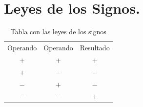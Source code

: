 \documentclass[oneside]{book}
\theoremstyle{definition}
\begin{document}
\section{Leyes de los Signos.}
\begin{table}[h]
  \centering
  \begin{tabular}{| c | c  | c |}
    \hline
    Operando & Operando & Resultado\\
    $+$  &  $+$  & $+$\\
    \hline
    $+$  &  $-$  & $-$\\
    \hline
    $-$  &  $+$  & $-$\\
    \hline
    $-$  &  $-$  & $+$\\
    \hline
  \end{tabular}
  \caption{Tabla con las leyes de los signos}
  \label{tab:leyes_signos}
\end{table}






































\end{document}
